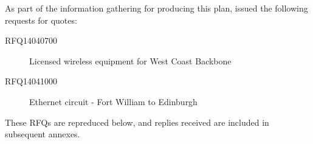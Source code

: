 
As part of the information gathering for producing this plan, \HUBS{}
issued the following requests for quotes:
\begin{description}
  \item[RFQ14040700] Licensed wireless equipment for West Coast
    Backbone
  \item[RFQ14041000] Ethernet circuit - Fort William to Edinburgh
\end{description}

These RFQs are repreduced below, and replies received are included in
subsequent annexes.




